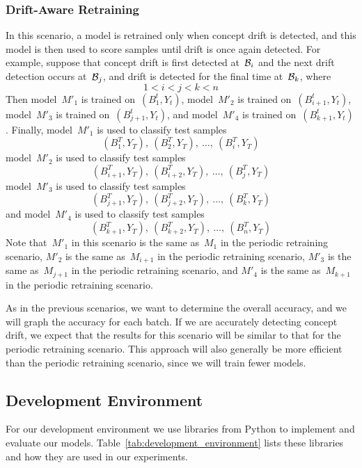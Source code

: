 \documentclass[12pt]{article}
\begin{document}
\subsubsection{Drift-Aware Retraining}
 
In this scenario, a model is retrained only when 
concept drift is detected, and this model is then used to score samples until drift is 
once again detected.
For example, suppose that concept drift is first detected at~${\cal B}_i$ and 
the next drift detection occurs at~${\cal B}_j$, and drift is detected for the final time
at~${\cal B}_k$, where
$$
  1 < i < j < k < n
$$ 
Then model~$M'_1$ is trained on~$(B^t_1,Y_t)$,
model~$M'_2$ is trained on~$(B^t_{i+1},Y_t)$,
model~$M'_3$ is trained on~$(B^t_{j+1},Y_t)$, and
model~$M'_4$ is trained on~$(B^t_{k+1},Y_t)$.
Finally, model~$M'_1$ is used to classify test samples
$$
    (B^T_1,Y_T),\ (B^T_2,Y_T),\ \ldots,\ (B^T_i,Y_T)
$$
model~$M'_2$ is used to classify test samples
$$
    (B^T_{i+1},Y_T),\ (B^T_{i+2},Y_T),\ \ldots,\ (B^T_j,Y_T)
$$
model~$M'_3$ is used to classify test samples
$$
    (B^T_{j+1},Y_T),\ (B^T_{j+2},Y_T),\ \ldots,\ (B^T_k,Y_T)
$$
and model~$M'_4$ is used to classify test samples
$$
    (B^T_{k+1},Y_T),\ (B^T_{k+2},Y_T),\ \ldots,\ (B^T_n,Y_T)
$$
Note that~$M'_1$ in this scenario is the same as~$M_1$ in the periodic retraining scenario,
$M'_2$ is the same as~$M_{i+1}$ in the periodic retraining scenario,
$M'_3$ is the same as~$M_{j+1}$ in the periodic retraining scenario, and
$M'_4$ is the same as~$M_{k+1}$ in the periodic retraining scenario.

As in the previous scenarios, 
we want to determine the overall accuracy, and we will graph the accuracy for each batch.
If we are accurately detecting concept drift, we expect that the results for
this scenario will be similar to that for the periodic retraining scenario.
This approach will also generally be more efficient than the periodic
retraining scenario, since we will train fewer models.

\subsection{Development Environment}

For our development environment we use libraries from Python to 
implement and evaluate our models. Table~\ref{tab:development_environment} 
lists these libraries and how they are used in our experiments.
\end{document}
